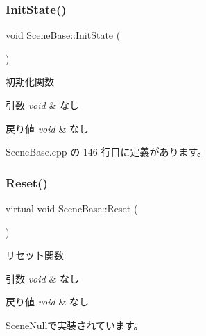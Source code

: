 \subsubsection{\texorpdfstring{Init\+State()}{InitState()}}
{\footnotesize\ttfamily void Scene\+Base\+::\+Init\+State (\begin{DoxyParamCaption}{ }\end{DoxyParamCaption})}



初期化関数 


\begin{DoxyParams}{引数}
{\em void} & なし \\
\hline
\end{DoxyParams}

\begin{DoxyRetVals}{戻り値}
{\em void} & なし \\
\hline
\end{DoxyRetVals}


 Scene\+Base.\+cpp の 146 行目に定義があります。

\mbox{\label{class_scene_base_a80611ca266dc84f466b96913ace28b8e}} 
\subsubsection{\texorpdfstring{Reset()}{Reset()}}
{\footnotesize\ttfamily virtual void Scene\+Base\+::\+Reset (\begin{DoxyParamCaption}{ }\end{DoxyParamCaption})\hspace{0.3cm}{\ttfamily [pure virtual]}}



リセット関数 


\begin{DoxyParams}{引数}
{\em void} & なし \\
\hline
\end{DoxyParams}

\begin{DoxyRetVals}{戻り値}
{\em void} & なし \\
\hline
\end{DoxyRetVals}


\mbox{\hyperlink{class_scene_null_ae71209e6283270d35a3fad40103e9572}{Scene\+Null}}で実装されています。

\mbox{\label{class_scene_base_a38f9cab88bd112b92f5a93e4541a605a}} 
